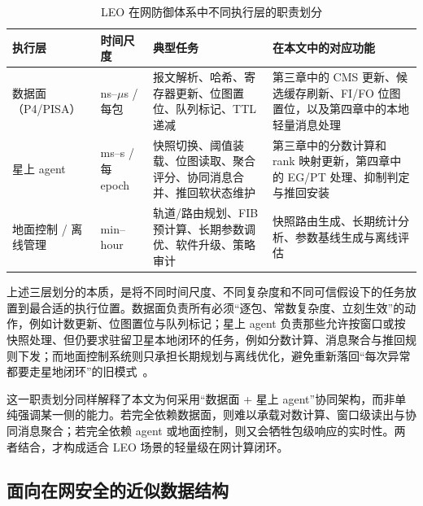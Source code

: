\begin{table}[t]
\centering
\caption{LEO 在网防御体系中不同执行层的职责划分}
\label{tab:ch2_plane_roles}
\small
\begin{tabular}{|p{2.4cm}|p{2.2cm}|p{4.0cm}|p{4.0cm}|}
\hline
执行层 & 时间尺度 & 典型任务 & 在本文中的对应功能 \\
\hline
数据面（P4/PISA） & ns--$\mu$s / 每包 & 报文解析、哈希、寄存器更新、位图置位、队列标记、TTL 递减 & 第三章中的 CMS 更新、候选缓存刷新、FI/FO 位图置位，以及第四章中的本地轻量消息处理 \\
\hline
星上 agent & ms--s / 每 epoch & 快照切换、阈值装载、位图读取、聚合评分、协同消息合并、推回软状态维护 & 第三章中的分数计算和 rank 映射更新，第四章中的 EG/PT 处理、抑制判定与推回安装 \\
\hline
地面控制 / 离线管理 & min--hour & 轨道/路由规划、FIB 预计算、长期参数调优、软件升级、策略审计 & 快照路由生成、长期统计分析、参数基线生成与离线评估 \\
\hline
\end{tabular}
\end{table}

上述三层划分的本质，是将不同时间尺度、不同复杂度和不同可信假设下的任务放置到最合适的执行位置。数据面负责所有必须“逐包、常数复杂度、立刻生效”的动作，例如计数更新、位图置位与队列标记；星上 agent 负责那些允许按窗口或按快照处理、但仍要求驻留卫星本地闭环的任务，例如分数计算、消息聚合与推回规则下发；而地面控制系统则只承担长期规划与离线优化，避免重新落回“每次异常都要走星地闭环”的旧模式~\cite{bosshart2013rmt, bosshart2014p4, p4_survey}。

这一职责划分同样解释了本文为何采用“数据面 + 星上 agent”协同架构，而非单纯强调某一侧的能力。若完全依赖数据面，则难以承载对数计算、窗口级读出与协同消息聚合；若完全依赖 agent 或地面控制，则又会牺牲包级响应的实时性。两者结合，才构成适合 LEO 场景的轻量级在网计算闭环。


\subsection{面向在网安全的近似数据结构}

